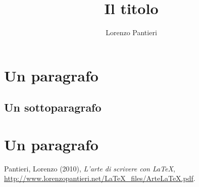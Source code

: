 \documentclass[a4paper,11pt]{article}
\begin{document}
	\title{Il titolo}
	\author{Lorenzo Pantieri}
	
	\maketitle
	
	\begin{abstract}
		\lipsum[1]
	\end{abstract}
	
	\tableofcontents
	
	\section{Un paragrafo}
	\lipsum[1]
	
	\subsection{Un sottoparagrafo}
	\lipsum[1]
	
	\section{Un paragrafo}
	\label{sec:esempio}
	\lipsum[1]
	
	\begin{thebibliography}{9}
	Pantieri, Lorenzo (2010), \emph{L’arte di scrivere con \LaTeX},
	\url{http://www.lorenzopantieri.net/LaTeX_files/ArteLaTeX.pdf}.
	\end{thebibliography}
\end{document}
